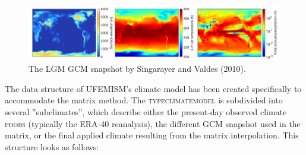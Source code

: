 \documentclass{article}
\begin{document}
\begin{figure}[h!] \label{fig:climate_GCM_LGM}
  \includegraphics[width=0.95\linewidth]{Fig_climate_GCM_LGM.png}
  \caption{The LGM GCM snapshot by Singarayer and Valdes (2010).}
\end{figure}

The data structure of UFEMISM's climate model has been created specifically to accommodate the matrix method. The \textsc{type\textunderscore climate\textunderscore model} is subdivided into several ''subclimates'', which describe either the present-day observed climate \textsc{pd\textunderscore obs} (typically the ERA-40 reanalysis), the different GCM snapshot used in the matrix, or the final applied climate resulting from the matrix interpolation. This structure looks as follows:
\end{document}
